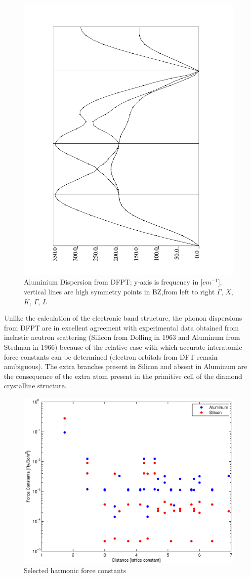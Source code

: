 \documentclass{article}
\begin{document}
\begin{figure}[h!]
\centering
\includegraphics[scale=0.4, angle=-90]{alph}
\caption{Aluminium Dispersion from DFPT; y-axis is frequency in [$cm^{-1}$], vertical lines are high symmetry points in BZ,from left to right $\Gamma$, $X$, $K$, $\Gamma$, $L$}
\end{figure}
Unlike the calculation of the electronic band structure, the phonon dispersions from DFPT are in excellent agreement with experimental data obtained from inelastic neutron scattering (Silicon from Dolling in 1963 and Aluminum from Stedman in 1966)  because of the relative ease with which accurate interatomic force constants can be determined (electron orbitals from DFT remain amibiguous). The extra branches present in Silicon and absent in Aluminum are the consequence of the extra atom present in the primitive cell of the diamond crystalline structure.

\begin{figure}[h!]
\centering
\includegraphics[scale=0.5]{fc}
\caption{Selected harmonic force constants}
\end{figure}
\end{document}
